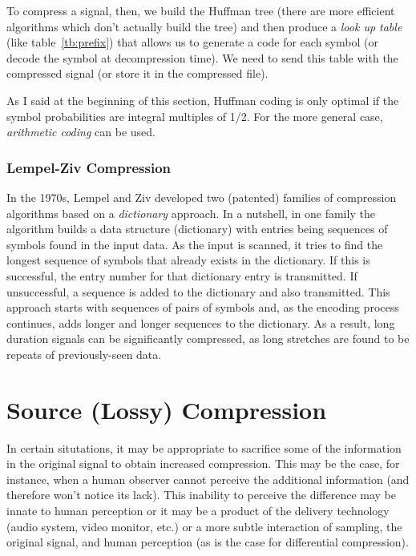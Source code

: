 To compress a signal, then, we build the Huffman tree (there
are more efficient algorithms which don't actually build the tree) and
then produce a \emph{look up table} (like table~\ref{tb:prefix}) that
allows us to generate a code for each symbol (or decode the symbol at
decompression time). We need to send this table with the compressed
signal (or store it in the compressed file).

As I said at the beginning of this section, Huffman coding is only
optimal if the symbol probabilities are integral multiples of 1/2. For
the more general case, \emph{arithmetic coding} can be used.

\subsubsection{Lempel-Ziv Compression}

In the 1970s, Lempel and Ziv developed two (patented) families of
compression algorithms based on a \emph{dictionary} approach. In a
nutshell, in one family the algorithm builds a data structure
(dictionary) with entries being sequences of symbols found in the
input data. As the input is scanned, it tries to find the longest
sequence of symbols that already exists in the dictionary.  If this is
successful, the entry number for that dictionary entry is
transmitted.  If unsuccessful, a sequence is added to the dictionary
and also transmitted. This approach starts with sequences of pairs of
symbols and, as the encoding process continues, adds longer and longer
sequences to the dictionary. As a result, long duration signals can be
significantly compressed, as long stretches are found to be repeats of
previously-seen data.

\section{Source (Lossy) Compression}

In certain situtations, it may be appropriate to sacrifice some of the
information in the original signal to obtain increased compression.
This may be the case, for instance, when a human observer cannot
perceive the additional information (and therefore won't notice its
lack).  This inability to perceive the difference may be innate to
human perception or it may be a product of the delivery technology
(audio system, video monitor, etc.) or a more subtle interaction of
sampling, the original signal, and human perception (as is the case
for differential compression).

